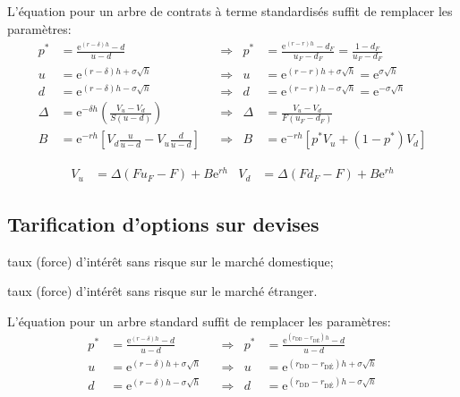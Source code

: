 \documentclass[10pt, french]{article}
\begin{document}
\begin{multicols*}{2}
L'équation pour un arbre de contrats à terme standardisés suffit de remplacer les paramètres:
\begin{align*}
	p^{*}	
		&=	\frac{\textrm{e}^{(r - \delta)h} - d}{u - d}	&
	&\Rightarrow	&
	p^{*}	
		&=	\frac{\textrm{e}^{(r -r)h} - d_{F}}{u_{F} - d_{F}}
		=	\frac{1 - d_{F}}{u_{F} - d_{F}}	\\
	u	
		&=	\textrm{e}^{(r - \delta)h + \sigma \sqrt{h}}	&
	&\Rightarrow	&
	u	
		&=	\textrm{e}^{(r - r)h + \sigma \sqrt{h}}	
		=	\textrm{e}^{\sigma \sqrt{h}}	\\
	d	
		&=	\textrm{e}^{(r - \delta)h - \sigma \sqrt{h}}	&
	&\Rightarrow	&
	d	
		&=	\textrm{e}^{(r - r)h - \sigma \sqrt{h}}	
		=	\textrm{e}^{-\sigma \sqrt{h}}	\\
	\Delta
		&=	\textrm{e}^{-\delta h} \left(\frac{V_{u} - V_{d}}{S(u - d)}\right)	&
	&\Rightarrow	&
	\Delta
		&=	\frac{V_{u} - V_{d}}{F(u_{F} - d_{F})}	\\
	B	
		&=	\textrm{e}^{-rh} \left[V_{d} \frac{u}{u - d} - V_{u}\frac{d}{u - d}\right]	&
	&\Rightarrow	&
	B
		&=	\textrm{e}^{-rh} [p^{*} V_{u} + (1 - p^{*}) V_{d}]
\end{align*}

\begin{align*}
	V_{u}
		&=	\Delta	(F u_{F} - F) + B \textrm{e}^{rh}	&
	V_{d}
		&=	\Delta	(F d_{F} - F) + B \textrm{e}^{rh}
\end{align*}

\subsection{Tarification d'options sur devises}
\begin{distributions}[Notation]
\begin{description}[leftmargin = *]
	\item[$r_{\text{DD}}$]	taux (force) d'intérêt sans risque sur le marché domestique;
	\item[$r_{\text{DÉ}}$]	taux (force) d'intérêt sans risque sur le marché étranger.
\end{description}
\end{distributions}

L'équation pour un arbre standard suffit de remplacer les paramètres:
\begin{align*}
	p^{*}	&=	\frac{\textrm{e}^{(r - \delta)h} - d}{u - d}	&
	&\Rightarrow	&
	p^{*}	&=	\frac{\textrm{e}^{(r_{\text{DD}} - r_{\text{DÉ}})h} - d}{u - d}	\\
	u	&=	\textrm{e}^{(r - \delta)h + \sigma \sqrt{h}}	&
	&\Rightarrow	&
	u	&=	\textrm{e}^{(r_{\text{DD}} - r_{\text{DÉ}})h + \sigma \sqrt{h}}	\\
	d	&=	\textrm{e}^{(r - \delta)h - \sigma \sqrt{h}}	&
	&\Rightarrow	&
	d	&=	\textrm{e}^{(r_{\text{DD}} - r_{\text{DÉ}})h - \sigma \sqrt{h}}	
\end{align*}
	

\end{multicols*}
\end{document}
